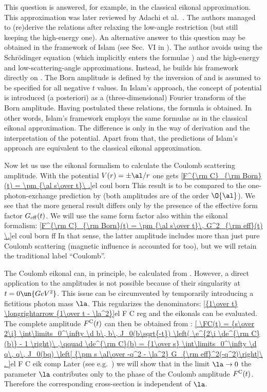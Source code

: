 This question is answered, for example, in the classical eikonal approximation. This approximation was later reviewed by Adachi et al.~. The authors managed to (re)derive the relations  after relaxing the low-angle restriction (but still keeping the high-energy one). An alternative answer to this question may be obtained in the framework of Islam (see Sec.~VI in ). The author avoids using the Schr\" odinger equation (which implicitly enters the formulae ) and the high-energy and low-scattering-angle approximations. Instead, he builds his framework directly on . The Born amplitude is defined by the inversion of  and is assumed to be specified for all negative $t$ values. In Islam's approach, the concept of potential is introduced (a posteriori) as a (three-dimensional) Fourier transform of the Born amplitude. Having postulated these relations, the formula  is obtained. In other words, Islam's framework employs the same formulae  as in the classical eikonal approximation. The difference is only in the way of derivation and the interpretation of the potential. Apart from that, the predictions of Islam's approach are equivalent to the classical eikonal approximation.

Now let us use the eikonal formalism to calculate the Coulomb scattering amplitude. With the potential $V(r) = \pm \al/r$ one gets
\eqref{F^{\rm C}_{\rm Born}(t) = \pm {\al s\over t}\ .}{el coul born}
This result is to be compared to the one-photon-exchange prediction by   (both amplitudes are of the order $\O{\al}$). We see that the more general  result differs only by the presence of the effective form factor $G_{\rm eff}(t)$. We will use the same form factor also within the eikonal formalism:
\eqref{F^{\rm C}_{\rm Born}(t) = \pm {\al s\over t}\, G^2_{\rm eff}(t) \.}{el coul born ff}
In that sense, the latter amplitude includes more than just pure Coulomb scattering (magnetic influence is accounted for too), but we will retain the traditional label ``Coulomb''.

The Coulomb eikonal can, in principle, be calculated from . However, a direct application to the amplitudes  is not possible because of their singularity at $t=0\un{GeV^2}$. This issue can be circumvented by temporarily introducing a fictitious photon mass $\la$. This regularizes the denominators:
\eqref{{1\over t} \longrightarrow {1\over t - \la^2}}{el F C reg}
and the eikonals can be evaluated. The complete amplitude $F^{\rm C}(t)$ can then be obtained from :
\eqref{
	\FC(t) = {s\over 2\i} \int\limits_0^\infty \d b\, b\, J_0(b\sqrt{-t}) \left( \e^{2\i \de^{\rm C}(b)} - 1 \right)\ ,\qquad
	\de^{\rm C}(b) = {1\over s} \int\limits_0^\infty \d q\, q\, J_0(bq) \left[ {\pm s \al\over -q^2 - \la^2} G_{\rm eff}^2(-q^2)\right]\ .
}{el F C eik comp}
Later (see e.g.~) we will show that in the limit $\la\to 0$ the parameter $\la$ contributes only to the phase of the Coulomb amplitude $F^{\rm C}(t)$. Therefore the corresponding cross-section is independent of $\la$.

